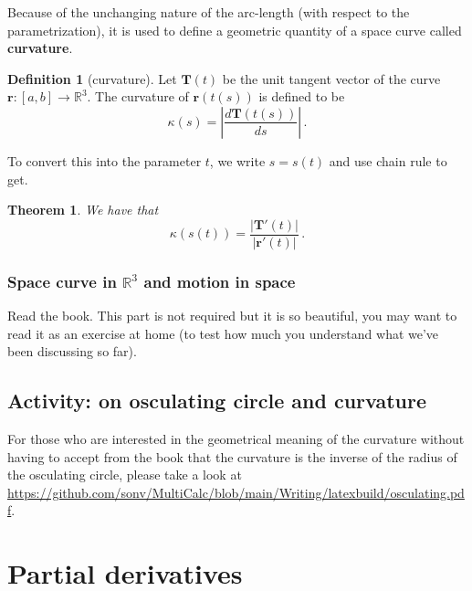 \documentclass[
]{article}
\newtheorem{theorem}{Theorem}[section]
\theoremstyle{definition}
\newtheorem{definition}{Definition}[section]
\theoremstyle{definition}
\theoremstyle{definition}
\theoremstyle{definition}
\theoremstyle{remark}
\begin{document}
Because of the unchanging nature of the arc-length (with respect to the
parametrization),
it is used to define a geometric quantity of a space curve called \textbf{curvature}.

\begin{definition}[curvature]
Let \(\mathbf{T}(t)\) be the unit tangent vector of the curve \(\mathbf{r}:[a,b] \to \mathbb{R}^3\).
The curvature of \(\mathbf{r}(t(s))\) is defined to be
\begin{equation*}
    \kappa(s) = \left| \frac{d \mathbf{T}(t(s))}{ds}\right| \,.
\end{equation*}
\end{definition}

To convert this into the parameter \(t\), we write \(s= s(t)\) and use chain rule
to get.

\begin{theorem}
We have that
\begin{equation*}
    \kappa(s(t)) =  \frac{|\mathbf{T}'(t)|}{|\mathbf{r}'(t)|}   \,.
\end{equation*}
\end{theorem}

\subsubsection{\texorpdfstring{Space curve in \(\mathbb{R}^3\) and motion in space}{Space curve in \textbackslash mathbb\{R\}\^{}3 and motion in space}}\label{space-curve-in-mathbbr3-and-motion-in-space}

Read the book. This part is not required but it is so beautiful, you may want to read it
as an exercise at home (to test how much you understand what we've been discussing so far).

\subsection{Activity: on osculating circle and curvature}\label{activity-on-osculating-circle-and-curvature}

For those who are interested in the geometrical meaning of the curvature without having
to accept from the book that the curvature is the inverse of the radius of the osculating circle,
please take a look at \url{https://github.com/sonv/MultiCalc/blob/main/Writing/latexbuild/osculating.pdf}.

\newpage

\section{Partial derivatives}\label{partial-derivatives}
\end{document}
